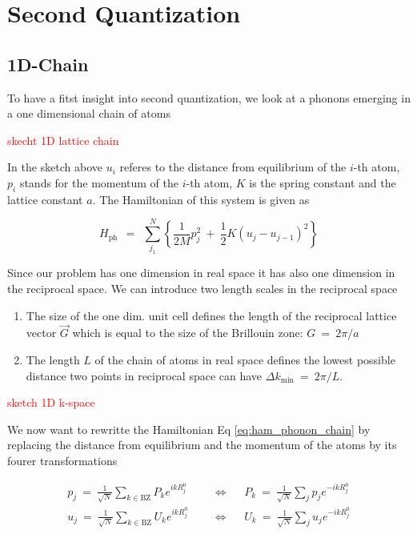 \documentclass[10pt]{report}
\numberwithin{equation}{chapter}
\newcommand{\refEq}[1]{
  Eq  \ref{#1}
}
\begin{document}
%

\chapter{Second Quantization}

\section{1D-Chain}

To have a fitst insight into second quantization, we look at a phonons emerging in a one dimensional chain of atoms

\textcolor{red}{skecht 1D lattice chain}


In the sketch above $u_i$ referes to the distance from equilibrium of the $i$-th atom, $p_i$ stands for the momentum of the $i$-th atom, $K$ is the spring constant and the lattice constant $a$.
The Hamiltonian of this system is given as

\begin{equation} \label{eq:ham_phonon_chain}
  H_\text{ph} ~~=~~ \sum_{j_1}^N \left\{ \frac{1}{2M} p_j^2 ~+~ \frac{1}{2} K (u_j - u_{j-1})^2 \right\}
\end{equation}

Since our problem has one dimension in real space it has also one dimension in the reciprocal space. We can introduce two length scales in the reciprocal space

\begin{enumerate}
  \item{The size of the one dim. unit cell defines the length of the reciprocal lattice vector $\vec{G}$ which is equal to the size of the Brillouin zone: $ G ~=~ 2\pi/a$}
  \item{The length $L$ of the chain of atoms in real space defines the lowest possible distance two points in reciprocal space can have $\Delta k_\text{min} ~=~ 2\pi/L$.}
\end{enumerate}


\textcolor{red}{sketch 1D k-space}


We now want to rewritte the Hamiltonian \refEq{eq:ham_phonon_chain} by replacing the distance from equilibrium and the momentum of the atoms by its fourer transformations

\begin{align}
  p_j ~=~ \frac{1}{\sqrt{N}} \sum_{k \in \text{BZ}} P_k e^{ikR^0_j} 
  ~~~~~~& \Longleftrightarrow~~~~~~
  P_k ~=~ \frac{1}{\sqrt{N}} \sum_{j} p_j e^{-ikR^0_j}\\
  u_j ~=~ \frac{1}{\sqrt{N}} \sum_{k \in \text{BZ}} U_k e^{ikR^0_j} 
  ~~~~~~& \Longleftrightarrow~~~~~~
  U_k ~=~ \frac{1}{\sqrt{N}} \sum_{j} u_j e^{-ikR^0_j}
\end{align}
\end{document}
